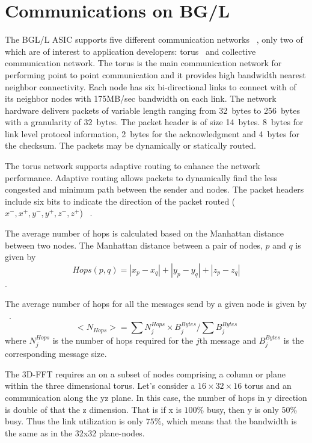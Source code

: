 \section {Communications on BG/L}
\label{sec:communications}

The BGL/L ASIC supports five different communication
networks  ~\cite{Gara2005}, only two of which are of interest to
application developers: torus~\cite{adiga:2005} and collective
communication network.  The torus is the main
communication network for performing point to point communication and
it provides high bandwidth nearest neighbor connectivity. Each node
has six bi-directional links to connect with of its neighbor
nodes with 175MB/sec bandwidth on each link. The network hardware delivers
packets of variable length ranging from 32~bytes to 256~bytes with a
granularity of 32~bytes. The packet header is of size
14~bytes. 8~bytes for link level protocol information, 2~bytes for the
acknowledgment and 4~bytes for the checksum.%
The packets may be dynamically or statically routed.

The torus network supports adaptive routing to enhance the network
performance. Adaptive routing allows packets to dynamically find the
less congested and minimum path between the sender and nodes.  The
packet headers include six bits to indicate the direction of the
packet routed ($x^-, x^+, y^-, y^+, z^-, z^+$) ~\cite{Yu:2006}.

The average number of hops is calculated based on the Manhattan
distance between two nodes. The Manhattan distance between a pair of
nodes, $p$ and $q$ is given by 
\begin{displaymath}
Hops(p,q) = |x_p -x_q|+|y_p - y_q|+|z_p -z_q|
\end{displaymath}.

The average number of hops for all the messages send by a given node
is given by ~\cite{Yu:2006}. 
\begin{displaymath}
<N_{Hops}> = \sum{ N^{Hops}_j \times B^{Bytes}_j } / {
  \sum{B^{Bytes}_j} }
\end{displaymath}
where $N^{Hops}_j$ is the number of hops required for the $j$th
message and $B^{Bytes}_j$ is the corresponding message size.


The 3D-FFT requires an \alltoall on a subset of nodes comprising a
column or plane within the three dimensional torus. Let's consider a
$16\times 32\times 16$ torus and an \alltoall communication along the
yz plane. In this case, the number of hops in y direction is double of
that the z dimension.  That is if x is $100\%$ busy, then y is only
$50\%$ busy. Thus the link utilization is only $75\%$, which means
that the bandwidth is the same as in the 32x32 plane-nodes.

